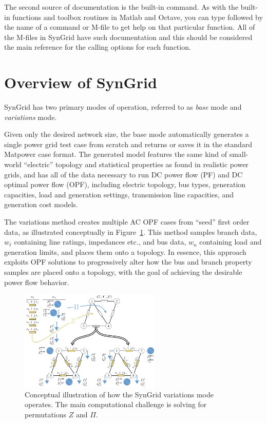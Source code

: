\documentclass[12pt]{article}
\newcommand{\matlab}[0]{{\sc Matlab}}
\newcommand{\matpower}[0]{{\sc Matpower}}
\newcommand{\syngrid}[0]{{SynGrid}}
\newcommand{\code}[1]{{\relsize{-0.5}{\tt{{#1}}}}}  %
\numberwithin{equation}{section}
\numberwithin{table}{section}
\numberwithin{figure}{section}
\begin{document}
The second source of documentation is the built-in \code{help} command. As with the built-in functions and toolbox routines in \matlab{} and Octave, you can type \code{help} followed by the name of a command or M-file to get help on that particular function. All of the M-files in \syngrid{} have such documentation and this should be considered the main reference for the calling options for each function.%

\clearpage
\section{Overview of \syngrid{}}
\label{sec:overview}

\syngrid{} has two primary modes of operation, referred to as \emph{base} mode and \emph{variations} mode.

Given only the desired network size, the base mode automatically generates a single power grid test case from scratch and returns or saves it in the standard \matpower{} case format. The generated model features the same kind of small-world ``electric'' topology and statistical properties as found in realistic power grids, and has all of the data necessary to run DC power flow (PF) and DC optimal power flow (OPF), including electric topology, bus types, generation capacities, load and generation settings, transmission line capacities, and generation cost models.


The variations method creates multiple AC OPF cases from ``seed'' first order data, as illustrated conceptually in Figure~\ref{fig:variations_mode_cartoon}.
This method samples branch data, $w_{\ell}$ containing line ratings, impedances etc., and bus data, $w_{n}$ containing load and generation limits, and places them onto a topology.
In essence, this approach exploits OPF solutions to progressively alter how the bus and branch property samples are placed onto a topology, with the goal of achieving the desirable power flow behavior.

\begin{figure}[hb]
\centering
\includegraphics[width=0.6\textwidth]{figs/variationsmodecartoon.pdf}
\caption[Variations Mode Approach]{Conceptual illustration of how the \syngrid{} variations mode operates. The main computational challenge is solving for permutations $Z$ and $\Pi$.}
\label{fig:variations_mode_cartoon}
\end{figure}
\end{document}

